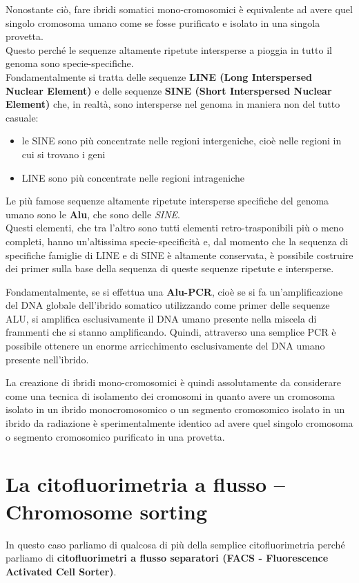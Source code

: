 \documentclass[11pt]{book}
\begin{document}
Nonostante ciò, fare ibridi somatici mono-cromosomici è equivalente ad avere quel singolo cromosoma umano come se fosse purificato e isolato in una singola provetta.\\
Questo perché le sequenze altamente ripetute intersperse a pioggia in tutto il genoma sono specie-specifiche.\\
Fondamentalmente si tratta delle sequenze \textbf{LINE (Long Interspersed Nuclear Element)} e delle sequenze \textbf{SINE (Short Interspersed Nuclear Element)} che, in realtà, sono intersperse nel genoma in maniera non del tutto casuale:
\begin{itemize}
\item le SINE sono più concentrate nelle regioni intergeniche, cioè nelle regioni in cui si trovano i geni
\item LINE sono più concentrate nelle regioni intrageniche
\end{itemize}

Le più famose sequenze altamente ripetute intersperse specifiche del genoma umano sono le \textbf{Alu}, che sono delle \emph{SINE}.\\
Questi elementi, che tra l’altro sono tutti elementi retro-trasponibili più o meno completi, hanno un’altissima specie-specificità e, dal momento che la sequenza di specifiche famiglie di LINE e di SINE è altamente conservata, è possibile costruire dei primer sulla base della sequenza di queste sequenze ripetute e intersperse.

Fondamentalmente, se si effettua una \textbf{Alu-PCR}, cioè se si fa un’amplificazione del DNA globale dell’ibrido somatico utilizzando come primer delle sequenze ALU, si amplifica esclusivamente il DNA umano presente nella miscela di frammenti che si stanno amplificando.
Quindi, attraverso una semplice PCR è possibile ottenere un enorme arricchimento esclusivamente del DNA umano presente nell’ibrido.
 
La creazione di ibridi mono-cromosomici è quindi assolutamente da considerare come una tecnica di isolamento dei cromosomi in quanto avere un cromosoma isolato in un ibrido monocromosomico o un segmento cromosomico isolato in un ibrido da radiazione è sperimentalmente identico ad avere quel singolo cromosoma o segmento cromosomico purificato in una provetta.

\section{La citofluorimetria a flusso – Chromosome sorting}
In questo caso parliamo di qualcosa di più della semplice citofluorimetria perché parliamo di \textbf{citofluorimetri a flusso separatori (FACS - Fluorescence Activated Cell Sorter)}.
\end{document}
